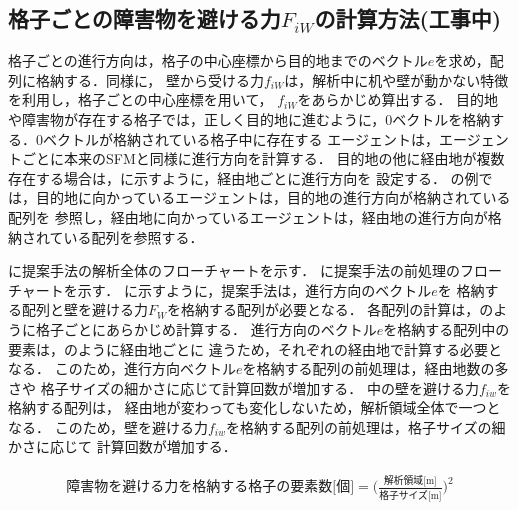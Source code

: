 \subsection{格子ごとの障害物を避ける力$F_{iW}$の計算方法(工事中)}
格子ごとの進行方向は，格子の中心座標から目的地までのベクトル$e$を求め，配列に格納する．同様に，
壁から受ける力$f_{iW}$は，解析中に机や壁が動かない特徴を利用し，格子ごとの中心座標を用いて，
$f_{iW}$をあらかじめ算出する．
目的地や障害物が存在する格子では，正しく目的地に進むように，0ベクトルを格納する．0ベクトルが格納されている格子中に存在する
エージェントは，エージェントごとに本来のSFMと同様に進行方向を計算する．
目的地の他に経由地が複数存在する場合は，に示すように，経由地ごとに進行方向を
設定する．
の例では，目的地に向かっているエージェントは，目的地の進行方向が格納されている配列を
参照し，経由地に向かっているエージェントは，経由地の進行方向が格納されている配列を参照する．

に提案手法の解析全体のフローチャートを示す．
に提案手法の前処理のフローチャートを示す．
に示すように，提案手法は，進行方向のベクトル$e$を
格納する配列と壁を避ける力$F_W$を格納する配列が必要となる．
各配列の計算は，のように格子ごとにあらかじめ計算する．
進行方向のベクトル$e$を格納する配列中の要素は，のように経由地ごとに
違うため，それぞれの経由地で計算する必要となる．
このため，進行方向ベクトル$e$を格納する配列の前処理は，経由地数の多さや
格子サイズの細かさに応じて計算回数が増加する．
中の壁を避ける力$f_{iw}$を格納する配列は，
経由地が変わっても変化しないため，解析領域全体で一つとなる．
このため，壁を避ける力$f_{iw}$を格納する配列の前処理は，格子サイズの細かさに応じて
計算回数が増加する．



\begin{eqnarray}
 \mbox{障害物を避ける力を格納する格子の要素数[個]} =  \Big( \frac{\mbox{解析領域[m]}}{\mbox{格子サイズ[m]}} \Big) ^ 2
 \label{eq:fiw_youso_size}
\end{eqnarray}

